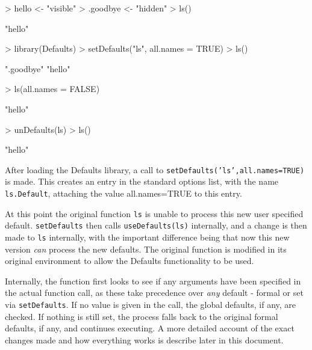 \documentclass{article}
\begin{document}
\begin{Schunk}
\begin{Sinput}
> hello <- "visible"
> .goodbye <- "hidden"
> ls()
\end{Sinput}
\begin{Soutput}
[1] "hello"
\end{Soutput}
\begin{Sinput}
> library(Defaults)
> setDefaults("ls", all.names = TRUE)
> ls()
\end{Sinput}
\begin{Soutput}
[1] ".goodbye" "hello"   
\end{Soutput}
\begin{Sinput}
> ls(all.names = FALSE)
\end{Sinput}
\begin{Soutput}
[1] "hello"
\end{Soutput}
\begin{Sinput}
> unDefaults(ls)
> ls()
\end{Sinput}
\begin{Soutput}
[1] "hello"
\end{Soutput}
\end{Schunk}

\noindent
After loading the {\sf Defaults} library, a call to
{\tt setDefaults('ls',all.names=TRUE)} is made. This
creates an entry in the standard {\sf options} list, with
the name {\tt ls.Default}, attaching the value all.names=TRUE
to this entry.

\vspace{3mm}
\noindent
At this point the original function {\tt ls} is unable to
process this new user specified default. {\tt setDefaults} then
calls
{\tt useDefaults(ls)} internally, and a change is then made 
to {\tt ls} internally,
with the important difference being that now this
new version {\em can} process the new defaults. The original 
function is modified in its original environment to allow the {\sf Defaults}
functionality to be used. 

\vspace{3mm}
\noindent
Internally, the function first looks to see if
any arguments have been specified in the actual
function call, as these take precedence over {\em any}
default - formal or set via {\tt setDefaults}. If no
value is given in the call, the global defaults, if any,
are checked.  If nothing is still set, the process falls
back to the original formal defaults, if any, and continues
executing. A more detailed account of the exact
changes made and how everything works
is describe later in this document.
\end{document}
